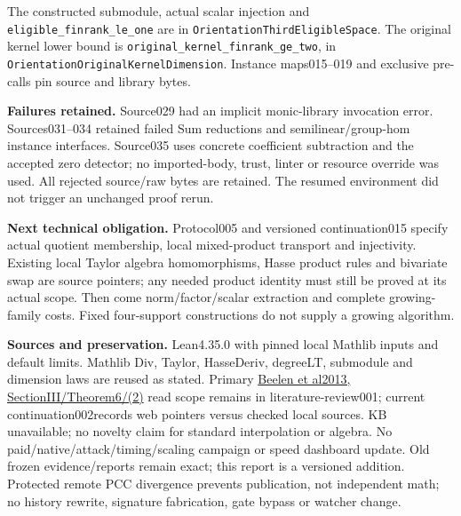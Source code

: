 \documentclass[10pt]{article}
\begin{document}
The constructed submodule, actual scalar injection and
\texttt{eligible\_finrank\_le\_one} are in
\texttt{OrientationThirdEligibleSpace}.
The original kernel lower bound is
\texttt{original\_kernel\_finrank\_ge\_two}, in
\texttt{OrientationOriginalKernelDimension}.
Instance maps015--019 and exclusive pre-calls pin source and library bytes.

\textbf{Failures retained.}
Source029 had an implicit monic-library invocation error.
Sources031--034 retained failed Sum reductions and semilinear/group-hom
instance interfaces. Source035 uses concrete coefficient subtraction and
the accepted zero detector; no imported-body, trust, linter or resource
override was used. All rejected source/raw bytes are retained.
The resumed environment did not trigger an unchanged proof rerun.

\textbf{Next technical obligation.}
Protocol005 and versioned continuation015 specify actual quotient membership,
local mixed-product transport and injectivity. Existing local Taylor algebra
homomorphisms, Hasse product rules and bivariate swap are source pointers;
any needed product identity must still be proved at its actual scope.
Then come norm/factor/scalar extraction and complete growing-family costs.
Fixed four-support constructions do not supply a growing algorithm.

\textbf{Sources and preservation.}
Lean4.35.0 with pinned local Mathlib inputs and default limits.
Mathlib Div, Taylor, HasseDeriv, degreeLT, submodule and dimension laws are
reused as stated. Primary
\href{https://doi.org/10.1109/TIT.2013.2243800}{Beelen et al2013, SectionIII/Theorem6/(2)}
read scope remains in literature-review001; current continuation002records
web pointers versus checked local sources. KB unavailable; no novelty claim
for standard interpolation or algebra.
No paid/native/attack/timing/scaling campaign or speed dashboard update.
Old frozen evidence/reports remain exact; this report is a versioned addition.
Protected remote PCC divergence prevents publication, not independent math;
no history rewrite, signature fabrication, gate bypass or watcher change.
\end{document}
